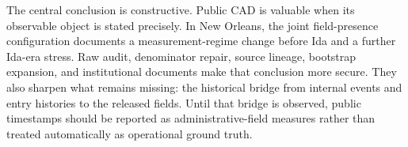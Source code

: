 \documentclass[11pt]{article}
\begin{document}
The central conclusion is constructive. Public CAD is valuable when its observable object is stated precisely. In New Orleans, the joint field-presence configuration documents a measurement-regime change before Ida and a further Ida-era stress. Raw audit, denominator repair, source lineage, bootstrap expansion, and institutional documents make that conclusion more secure. They also sharpen what remains missing: the historical bridge from internal events and entry histories to the released fields. Until that bridge is observed, public timestamps should be reported as administrative-field measures rather than treated automatically as operational ground truth.



\end{document}
